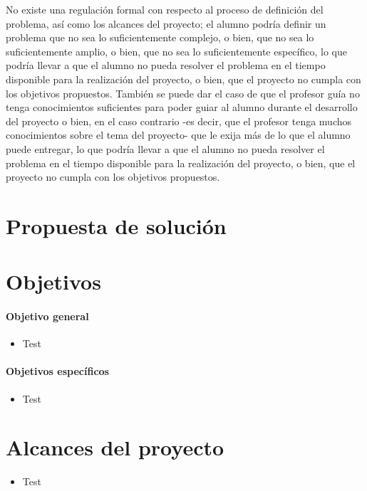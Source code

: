 No existe una regulación formal con respecto al proceso de definición del problema, así como los alcances del proyecto; el alumno podría definir un problema que no sea lo suficientemente complejo, o bien, que no sea lo suficientemente amplio, o bien, que no sea lo suficientemente específico, lo que podría llevar a que el alumno no pueda resolver el problema en el tiempo disponible para la realización del proyecto, o bien, que el proyecto no cumpla con los objetivos propuestos.
También se puede dar el caso de que el profesor guía no tenga conocimientos suficientes para poder guiar al alumno durante el desarrollo del proyecto o bien, en el caso contrario -es decir, que el profesor tenga muchos conocimientos sobre el tema del proyecto- que le exija más de lo que el alumno puede entregar, lo que podría llevar a que el alumno no pueda resolver el problema en el tiempo disponible para la realización del proyecto, o bien, que el proyecto no cumpla con los objetivos propuestos.



\section{Propuesta de solución}

\section{Objetivos}
\paragraph{Objetivo general}
\begin{itemize}
	\item Test
\end{itemize}
\paragraph{Objetivos específicos}
\begin{itemize}
	\item Test
\end{itemize}

\section{Alcances del proyecto}
\begin{itemize}
	\item Test
\end{itemize}